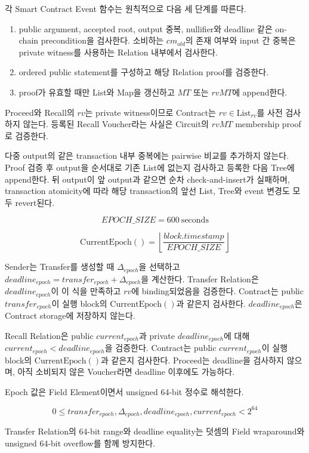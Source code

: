 \documentclass[11pt,a4paper]{extarticle}
\newcommand{\List}[1]{\mathrm{List}_{#1}}
\newcommand{\CurrentEpoch}{\mathrm{CurrentEpoch}}
\begin{document}
각 Smart Contract Event 함수는 원칙적으로 다음 세 단계를 따른다.

\begin{enumerate}
  \item public argument, accepted root, output 중복, nullifier와 deadline 같은
        on-chain precondition을 검사한다. 소비하는 $cm_{old}$의 존재 여부와 input
        간 중복은 private witness를 사용하는 Relation 내부에서 검사한다.
  \item ordered public statement를 구성하고 해당 Relation proof를 검증한다.
  \item proof가 유효할 때만 List와 Map을 갱신하고 $MT$ 또는 $rvMT$에 append한다.
\end{enumerate}

Proceed와 Recall의 $rv$는 private witness이므로 Contract는
$rv\in\List{rv}$를 사전 검사하지 않는다. 등록된 Recall Voucher라는 사실은 Circuit의
$rvMT$ membership proof로 검증한다.

다중 output의 같은 transaction 내부 중복에는 pairwise 비교를 추가하지 않는다. Proof
검증 후 output을 순서대로 기존 List에 없는지 검사하고 등록한 다음 Tree에 append한다.
뒤 output이 앞 output과 같으면 순차 check-and-insert가 실패하며, transaction atomicity에
따라 해당 transaction의 앞선 List, Tree와 event 변경도 모두 revert된다.

\[
  EPOCH\_SIZE=600\ \mathrm{seconds}
\]

\[
  \CurrentEpoch()
  =
  \left\lfloor\frac{block.timestamp}{EPOCH\_SIZE}\right\rfloor
\]

Sender는 Transfer를 생성할 때 $\Delta_{epoch}$을 선택하고
$deadline_{epoch}=transfer_{epoch}+\Delta_{epoch}$을 계산한다. Transfer Relation은
$deadline_{epoch}$이 이 식을 만족하고 $rv$에 binding되었음을 검증한다. Contract는
public $transfer_{epoch}$이 실행 block의 $\CurrentEpoch()$과 같은지 검사한다.
$deadline_{epoch}$은 Contract storage에 저장하지 않는다.

Recall Relation은 public $current_{epoch}$과 private $deadline_{epoch}$에 대해
$current_{epoch}<deadline_{epoch}$을 검증한다. Contract는 public
$current_{epoch}$이 실행 block의 $\CurrentEpoch()$과 같은지 검사한다. Proceed는
deadline을 검사하지 않으며, 아직 소비되지 않은 Voucher라면 deadline 이후에도 가능하다.

Epoch 값은 Field Element이면서 unsigned 64-bit 정수로 해석한다.

\[
0\leq transfer_{epoch},\Delta_{epoch},deadline_{epoch},current_{epoch}<2^{64}
\]

Transfer Relation의 64-bit range와 deadline equality는 덧셈의 Field wraparound와
unsigned 64-bit overflow를 함께 방지한다.
\end{document}
